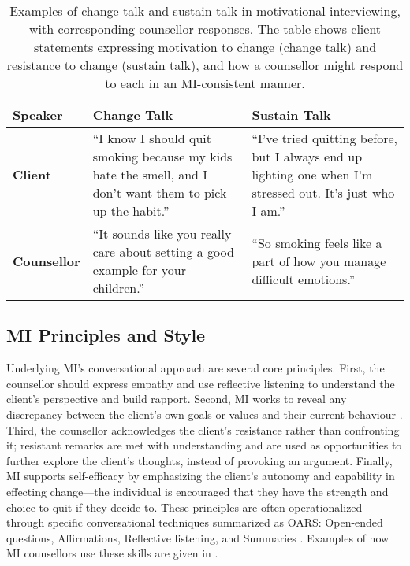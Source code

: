 \begin{table}[ht!]
\centering
\begin{tabular}{@{} p{} p{} p{} @{}}
\toprule
\textbf{Speaker} & \textbf{Change Talk} & \textbf{Sustain Talk} \\
\midrule
\textbf{Client} & 
``I know I should quit smoking because my kids hate the smell, and I don’t want them to pick up the habit.'' & 
``I’ve tried quitting before, but I always end up lighting one when I’m stressed out. It’s just who I am.'' \\
\addlinespace
\textbf{Counsellor} & 
``It sounds like you really care about setting a good example for your children.'' & 
``So smoking feels like a part of how you manage difficult emotions.'' \\
\bottomrule
\end{tabular}
\caption[Examples of change talk and sustain talk]{Examples of change talk and sustain talk in motivational interviewing, with corresponding counsellor responses. The table shows client statements expressing motivation to change (change talk) and resistance to change (sustain talk), and how a counsellor might respond to each in an MI-consistent manner.}
\label{tab:change_sustain_talk}
\end{table}



\subsection*{MI Principles and Style}
Underlying MI's conversational approach are several core principles. First, the counsellor should express empathy and use reflective listening to understand the client's perspective and build rapport. Second, MI works to reveal any discrepancy between the client's own goals or values and their current behaviour \cite{Miller_2023}. Third, the counsellor acknowledges the client's resistance rather than confronting it; resistant remarks are met with understanding and are used as opportunities to further explore the client's thoughts, instead of provoking an argument. Finally, MI supports self-efficacy by emphasizing the client's autonomy and capability in effecting change---the individual is encouraged that they have the strength and choice to quit if they decide to. These principles are often operationalized through specific conversational techniques summarized as OARS: Open-ended questions, Affirmations, Reflective listening, and Summaries \cite{Rollnick1995}. Examples of how MI counsellors use these skills are given in .


